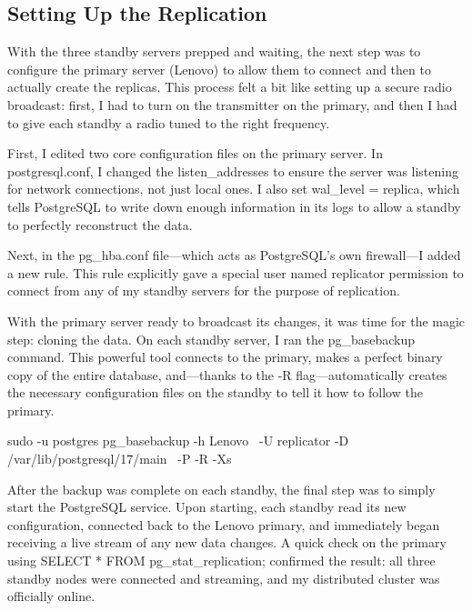\documentclass[conference]{IEEEtran}
\begin{document}
\subsection{Setting Up the Replication}
With the three standby servers prepped and waiting, the next step was to configure the primary server (Lenovo) to allow them to connect and then to actually create the replicas. This process felt a bit like setting up a secure radio broadcast: first, I had to turn on the transmitter on the primary, and then I had to give each standby a radio tuned to the right frequency.

First, I edited two core configuration files on the primary server. In postgresql.conf, I changed the listen\_addresses to ensure the server was listening for network connections, not just local ones. I also set wal\_level = replica, which tells PostgreSQL to write down enough information in its logs to allow a standby to perfectly reconstruct the data.

Next, in the pg\_hba.conf file—which acts as PostgreSQL's own firewall—I added a new rule. This rule explicitly gave a special user named replicator permission to connect from any of my standby servers for the purpose of replication.

With the primary server ready to broadcast its changes, it was time for the magic step: cloning the data. On each standby server, I ran the pg\_basebackup command. This powerful tool connects to the primary, makes a perfect binary copy of the entire database, and—thanks to the -R flag—automatically creates the necessary configuration files on the standby to tell it how to follow the primary.

sudo -u postgres pg\_basebackup -h Lenovo \
-U replicator -D /var/lib/postgresql/17/main \
-P -R -Xs

After the backup was complete on each standby, the final step was to simply start the PostgreSQL service. Upon starting, each standby read its new configuration, connected back to the Lenovo primary, and immediately began receiving a live stream of any new data changes. A quick check on the primary using SELECT * FROM pg\_stat\_replication; confirmed the result: all three standby nodes were connected and streaming, and my distributed cluster was officially online.


%
\end{document}
